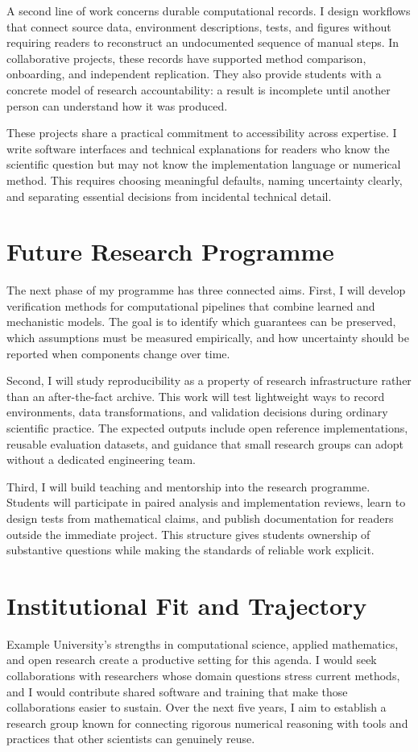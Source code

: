 \documentclass[type=research, medium=print]{careerdossier-statement}
\begin{document}
A second line of work concerns durable computational records. I design workflows
that connect source data, environment descriptions, tests, and figures without
requiring readers to reconstruct an undocumented sequence of manual steps. In
collaborative projects, these records have supported method comparison,
onboarding, and independent replication. They also provide students with a
concrete model of research accountability: a result is incomplete until another
person can understand how it was produced.

These projects share a practical commitment to accessibility across expertise.
I write software interfaces and technical explanations for readers who know the
scientific question but may not know the implementation language or numerical
method. This requires choosing meaningful defaults, naming uncertainty clearly,
and separating essential decisions from incidental technical detail.

\section*{Future Research Programme}

The next phase of my programme has three connected aims. First, I will develop
verification methods for computational pipelines that combine learned and
mechanistic models. The goal is to identify which guarantees can be preserved,
which assumptions must be measured empirically, and how uncertainty should be
reported when components change over time.

Second, I will study reproducibility as a property of research infrastructure
rather than an after-the-fact archive. This work will test lightweight ways to
record environments, data transformations, and validation decisions during
ordinary scientific practice. The expected outputs include open reference
implementations, reusable evaluation datasets, and guidance that small research
groups can adopt without a dedicated engineering team.

Third, I will build teaching and mentorship into the research programme.
Students will participate in paired analysis and implementation reviews, learn
to design tests from mathematical claims, and publish documentation for readers
outside the immediate project. This structure gives students ownership of
substantive questions while making the standards of reliable work explicit.

\section*{Institutional Fit and Trajectory}

Example University's strengths in computational science, applied mathematics,
and open research create a productive setting for this agenda. I would seek
collaborations with researchers whose domain questions stress current methods,
and I would contribute shared software and training that make those
collaborations easier to sustain. Over the next five years, I aim to establish a
research group known for connecting rigorous numerical reasoning with tools and
practices that other scientists can genuinely reuse.
\end{document}
